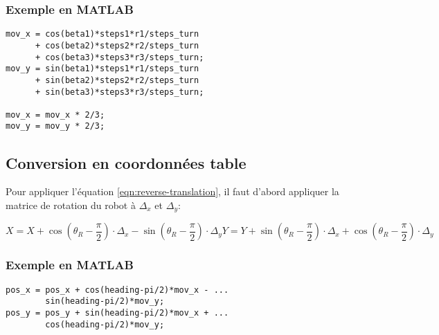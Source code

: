 \documentclass[a4paper]{paper}
\begin{document}
\subsubsection{Exemple en MATLAB}
\begin{lstlisting}
mov_x = cos(beta1)*steps1*r1/steps_turn
      + cos(beta2)*steps2*r2/steps_turn
      + cos(beta3)*steps3*r3/steps_turn;
mov_y = sin(beta1)*steps1*r1/steps_turn
      + sin(beta2)*steps2*r2/steps_turn
      + sin(beta3)*steps3*r3/steps_turn;

mov_x = mov_x * 2/3;
mov_y = mov_y * 2/3;
\end{lstlisting}

\subsection{Conversion en coordonnées table}
Pour appliquer l'équation \eqref{eqn:reverse-translation}, il faut d'abord appliquer
la matrice de rotation du robot à $\Delta_x$ et $\Delta_y$:

\begin{subequations}
    \begin{equation}
        X = X + \cos \left( \theta_R - \frac{\pi}{2} \right) \cdot \Delta_x - \sin \left( \theta_R - \frac{\pi}{2} \right) \cdot \Delta_y
    \end{equation}
    \begin{equation} 
        Y = Y + \sin \left( \theta_R - \frac{\pi}{2} \right) \cdot \Delta_x + \cos \left( \theta_R - \frac{\pi}{2} \right) \cdot \Delta_y
    \end{equation} 
    \label{eqn:coordinate-transform}
\end{subequations}

\subsubsection{Exemple en MATLAB}
\begin{lstlisting}
pos_x = pos_x + cos(heading-pi/2)*mov_x - ...
        sin(heading-pi/2)*mov_y;
pos_y = pos_y + sin(heading-pi/2)*mov_x + ...
        cos(heading-pi/2)*mov_y;
\end{lstlisting}
\end{document}
